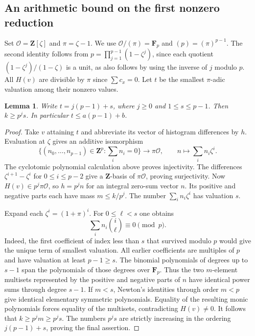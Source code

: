 \documentclass[11pt,letterpaper]{article}
\newcommand{\Fp}{\mathbf F_p}
\newcommand{\Z}{\mathbf Z}
\newtheorem{lemma}[theorem]{Lemma}
\theoremstyle{remark}
\begin{document}
\subsection{An arithmetic bound on the first nonzero reduction}

Set $\mathcal O=\Z[\zeta]$ and $\pi=\zeta-1$. We use $\mathcal O/(\pi)=\Fp$ and $(p)=(\pi)^{p-1}$. The second identity follows from $p=\prod_{j=1}^{p-1}(1-\zeta^j)$, since each quotient $(1-\zeta^j)/(1-\zeta)$ is a unit, as also follows by using the inverse of $j$ modulo $p$. All $H(v)$ are divisible by $\pi$ since $\sum c_x=0$. Let $t$ be the smallest $\pi$-adic valuation among their nonzero values.

\begin{lemma}\label{lem:massdigit}
Write $t=j(p-1)+s$, where $j\ge0$ and $1\le s\le p-1$. Then $k\ge p^j s$. In particular $t\le a(p-1)+b$.
\end{lemma}

\begin{proof}
Take $v$ attaining $t$ and abbreviate its vector of histogram differences by $h$. Evaluation at $\zeta$ gives an additive isomorphism
\[
 \{(n_0,\ldots,n_{p-1})\in\Z^p:\textstyle\sum_i n_i=0\}
 \longrightarrow \pi\mathcal O,\qquad n\longmapsto\sum_i n_i\zeta^i.
\]
The cyclotomic polynomial calculation above proves injectivity. The differences $\zeta^{i+1}-\zeta^i$ for $0\le i\le p-2$ give a $\Z$-basis of $\pi\mathcal O$, proving surjectivity. Now $H(v)\in p^j\pi\mathcal O$, so $h=p^j n$ for an integral zero-sum vector $n$. Its positive and negative parts each have mass $m\le k/p^j$. The number $\sum_i n_i\zeta^i$ has valuation $s$.

Expand each $\zeta^i=(1+\pi)^i$. For $0\le \ell<s$ one obtains
\[
  \sum_i n_i\binom{i}{\ell}\equiv0\pmod p .
\]
Indeed, the first coefficient of index less than $s$ that survived modulo $p$ would give the unique term of smallest valuation. All earlier coefficients are multiples of $p$ and have valuation at least $p-1\ge s$. The binomial polynomials of degrees up to $s-1$ span the polynomials of those degrees over $\Fp$. Thus the two $m$-element multisets represented by the positive and negative parts of $n$ have identical power sums through degree $s-1$. If $m<s$, Newton's identities through order $m<p$ give identical elementary symmetric polynomials. Equality of the resulting monic polynomials forces equality of the multisets, contradicting $H(v)\ne0$. It follows that $k\ge p^jm\ge p^js$. The numbers $p^js$ are strictly increasing in the ordering $j(p-1)+s$, proving the final assertion.
\end{proof}
\end{document}
